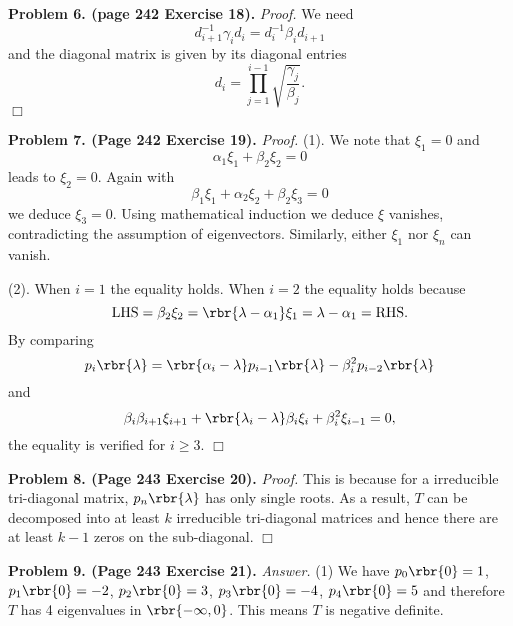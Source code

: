 \documentclass[english, nochinese]{pnote}
\begin{document}
\textbf{Problem 6. (page 242 Exercise 18).} \textit{Proof.} We need
\begin{equation}
d_{ i + 1 }^{-1} \gamma_i d_i = d_i^{-1} \beta_i d_{ i + 1 }
\end{equation}
and the diagonal matrix is given by its diagonal entries
\begin{equation}
d_i = \prod_{ j = 1 }^{ i - 1 } \sqrt{\frac{\gamma_j}{\beta_j}}.
\end{equation}
\hfill$\Box$

\textbf{Problem 7. (Page 242 Exercise 19).} \textit{Proof.} (1). We note that $ \xi_1 = 0 $ and
\begin{equation}
\alpha_1 \xi_1 + \beta_2 \xi_2 = 0
\end{equation}
leads to $ \xi_2 = 0 $. Again with
\begin{equation}
\beta_1 \xi_1 + \alpha_2 \xi_2 + \beta_2 \xi_3 = 0
\end{equation}
we deduce $ \xi_3 = 0 $. Using mathematical induction we deduce $\xi$ vanishes, contradicting the assumption of eigenvectors. Similarly, either $\xi_1$ nor $\xi_n$ can vanish.

(2). When $ i = 1 $ the equality holds. When $ i = 2 $ the equality holds because
\begin{equation}
\text{LHS} = \beta_2 \xi_2 = \rbr{ \lambda - \alpha_1 } \xi_1 = \lambda - \alpha_1 = \text{RHS}.
\end{equation}
By comparing
\begin{equation}
p_i \rbr{\lambda} = \rbr{ \alpha_i - \lambda } p_{ i - 1 } \rbr{\lambda} - \beta_i^2 p_{ i - 2 } \rbr{\lambda}
\end{equation}
and
\begin{equation}
\beta_i \beta_{ i + 1 } \xi_{ i + 1 } + \rbr{ \lambda_i - \lambda } \beta_i \xi_i + \beta_i^2 \xi_{ i - 1 } = 0,
\end{equation}
the equality is verified for $ i \ge 3 $.
\hfill$\Box$

\textbf{Problem 8. (Page 243 Exercise 20).} \textit{Proof.} This is because for a irreducible tri-diagonal matrix, $ p_n \rbr{\lambda} $ has only single roots. As a result, $T$ can be decomposed into at least $k$ irreducible tri-diagonal matrices and hence there are at least $ k - 1 $ zeros on the sub-diagonal.
\hfill$\Box$

\textbf{Problem 9. (Page 243 Exercise 21).} \textit{Answer.} (1) We have $ p_0 \rbr{0} = 1 $, $ p_1 \rbr{0} = -2 $, $ p_2 \rbr{0} = 3 $, $ p_3 \rbr{0} = -4 $, $ p_4 \rbr{0} = 5 $ and therefore $T$ has 4 eigenvalues in $ \rbr{ -\infty, 0 } $. This means $T$ is negative definite.
\end{document}
